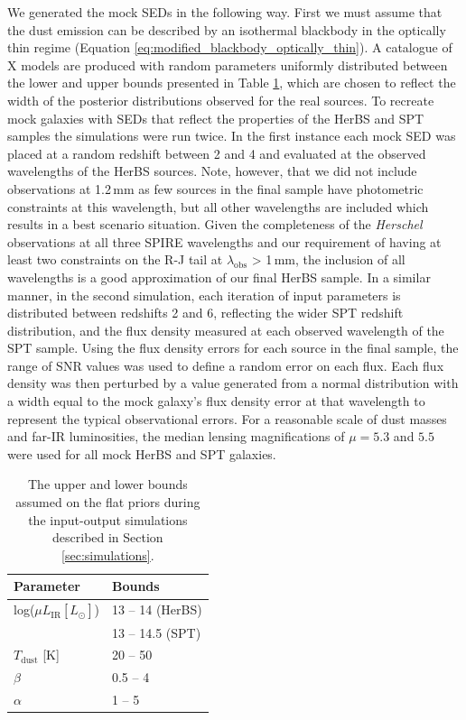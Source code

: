We generated the mock SEDs in the following way. First we must assume that the dust emission can be described by an isothermal blackbody in the optically thin regime (Equation \ref{eq:modified_blackbody_optically_thin}). A catalogue of {\color{red} X} models are produced with random parameters uniformly distributed between the lower and upper bounds presented in Table \ref{tab:simulation_inputs}, which are chosen to reflect the width of the posterior distributions observed for the real sources. To recreate mock galaxies with SEDs that reflect the properties of the HerBS and SPT samples the simulations were run twice. In the first instance each mock SED was placed at a random redshift between 2 and 4 and evaluated at the observed wavelengths of the HerBS sources. Note, however, that we did not include observations at 1.2\,mm as few sources in the final sample have photometric constraints at this wavelength, but all other wavelengths are included which results in a best scenario situation. Given the completeness of the \textit{Herschel} observations at all three SPIRE wavelengths and our requirement of having at least two constraints on the R-J tail at $\lambda_{\textrm{obs}}$ > 1\,mm, the inclusion of all wavelengths is a good approximation of our final HerBS sample. In a similar manner, in the second simulation, each iteration of input parameters is distributed between redshifts 2 and 6, reflecting the wider SPT redshift distribution, and the flux density measured at each observed wavelength of the SPT sample. Using the flux density errors for each source in the final sample, the range of SNR values was used to define a random error on each flux. Each flux density was then perturbed by a value generated from a normal distribution with a width equal to the mock galaxy's flux density error at that wavelength to represent the typical observational errors. For a reasonable scale of dust masses and far-IR luminosities, the median lensing magnifications of $\mu = 5.3$ and $5.5$ were used for all mock HerBS and SPT galaxies.

\begin{table}
    \centering
    \begin{tabular}{p{3cm}|p{3cm}}
        \hline
		\hline
        Parameter & Bounds \\
        \hline
        \hline
        log($\mu L_{\textrm{IR}} [L_{\odot}]$) & 13 -- 14 (HerBS) \\
        & 13 -- 14.5 (SPT) \\
		$T_{\textrm{dust}}$ [K] & 20 -- 50 \\
		$\beta$  & 0.5 -- 4 \\
		$\alpha$  & 1 -- 5 \\
        \hline
    \end{tabular}
    \caption[Bounds on the input parameter ranges for mock galaxy simulations]{The upper and lower bounds assumed on the flat priors during the input-output simulations described in Section \ref{sec:simulations}.}
    \label{tab:simulation_inputs}
\end{table}

